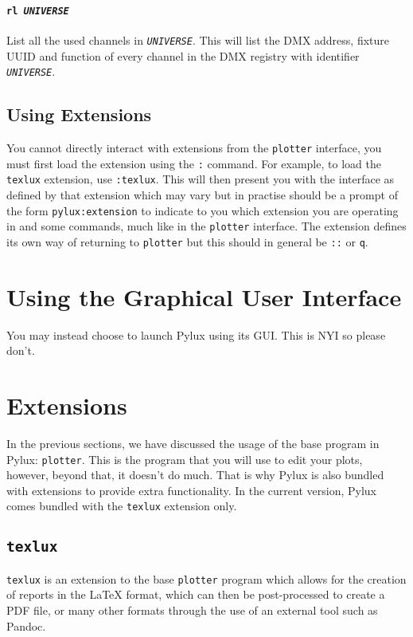 \documentclass[a4paper]{article}
\begin{document}
\paragraph{\texttt{rl \textit{UNIVERSE}}}
List all the used channels in \texttt{\textit{UNIVERSE}}. This will list the 
DMX address, fixture UUID and function of every channel in the DMX registry 
with identifier \texttt{\textit{UNIVERSE}}.

\subsection{Using Extensions}
You cannot directly interact with extensions from the \texttt{plotter} 
interface, you must first load the extension using the \texttt{:} command.
For example, to load the \texttt{texlux} extension, use \texttt{:texlux}. 
This will then present you with the interface as defined by that extension 
which may vary but in practise should be a prompt of the form 
\texttt{pylux:extension} to indicate to you which extension you are 
operating in and some commands, much like in the \texttt{plotter} interface.
The extension defines its own way of returning to \texttt{plotter} but this 
should in general be \texttt{::} or \texttt{q}.

\section{Using the Graphical User Interface}
You may instead choose to launch Pylux using its GUI. This is NYI so please 
don't.

\section{Extensions}
In the previous sections, we have discussed the usage of the base program in 
Pylux: \texttt{plotter}. This is the program that you will use to edit your
plots, however, beyond that, it doesn't do much. That is why Pylux is also 
bundled with extensions to provide extra functionality. In the current 
version, Pylux comes bundled with the \texttt{texlux} extension only.

\subsection{\texttt{texlux}}
\texttt{texlux} is an extension to the base \texttt{plotter} program which allows for the creation of reports in the \LaTeX{} format, which can then be 
post-processed to create a PDF file, or many other formats through the use of 
an external tool such as Pandoc.
\end{document}
